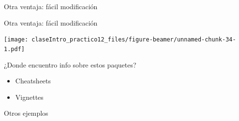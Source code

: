\documentclass[ignorenonframetext,]{beamer}
\newenvironment{Shaded}{\begin{snugshade}}{\end{snugshade}}
\newcommand{\CommentTok}[1]{\textcolor[rgb]{0.56,0.35,0.01}{\textit{#1}}}
\newcommand{\DataTypeTok}[1]{\textcolor[rgb]{0.13,0.29,0.53}{#1}}
\newcommand{\KeywordTok}[1]{\textcolor[rgb]{0.13,0.29,0.53}{\textbf{#1}}}
\newcommand{\NormalTok}[1]{#1}
\newcommand{\OperatorTok}[1]{\textcolor[rgb]{0.81,0.36,0.00}{\textbf{#1}}}
\newcommand{\StringTok}[1]{\textcolor[rgb]{0.31,0.60,0.02}{#1}}
\providecommand{\tightlist}{%
  \setlength{\itemsep}{0pt}\setlength{\parskip}{0pt}}
\begin{document}
\begin{frame}[fragile]{Otra ventaja: fácil modificación}
\protect\hypertarget{otra-ventaja-fuxe1cil-modificaciuxf3n}{}

\begin{Shaded}
\end{Shaded}

\end{frame}

\begin{frame}{Otra ventaja: fácil modificación}
\protect\hypertarget{otra-ventaja-fuxe1cil-modificaciuxf3n-1}{}

\texttt{[image: claseIntro\_practico12\_files/figure-beamer/unnamed-chunk-34-1.pdf]}

\end{frame}

\begin{frame}{¿Donde encuentro info sobre estos paquetes?}
\protect\hypertarget{donde-encuentro-info-sobre-estos-paquetes}{}

\begin{itemize}
\tightlist
\item
  Cheatsheets
\item
  Vignettes
\end{itemize}

\end{frame}

\begin{frame}{Otros ejemplos}
\protect\hypertarget{otros-ejemplos}{}

\end{frame}
\end{document}
